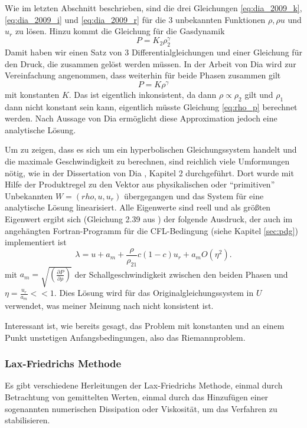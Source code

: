 Wie im letzten Abschnitt beschrieben, sind die drei Gleichungen
\ref{eq:dia_2009_k}, \ref{eq:dia_2009_i} und \ref{eq:dia_2009_r} für
die 3 unbekannten Funktionen $\rho, \rho u$ und $u_r$ zu lösen. Hinzu
kommt die Gleichung für die Gasdynamik
\[
P = K_2 \rho_2^\gamma
\]
Damit haben wir einen Satz von 3 Differentialgleichungen und einer
Gleichung für den Druck, die zusammen gelöst werden müssen. In der
Arbeit von Dia wird zur Vereinfachung angenommen, dass weiterhin für
beide Phasen zusammen gilt
\[
P = K \rho^\gamma
\]
mit konstanten $K$. Das ist eigentlich inkonsistent, da dann $\rho
\propto \rho_2$ gilt und $\rho_1$ dann nicht konstant sein kann,
eigentlich müsste Gleichung \ref{eq:rho_p} berechnet werden.  Nach
Aussage von Dia ermöglicht diese Approximation jedoch eine analytische
Lösung.

Um zu zeigen, dass es sich um ein hyperbolischen Gleichungssystem
handelt und die maximale Geschwindigkeit zu berechnen, sind reichlich
viele Umformungen nötig, wie in der Dissertation von Dia
\cite{dia_diss}, Kapitel 2 durchgeführt.  Dort wurde mit Hilfe der
Produktregel zu den Vektor aus physikalischen oder ``primitiven''
Unbekannten $W = (rho, u, u_r)$ übergegangen und das System für eine
analytische Lösung linearisiert. Alle Eigenwerte sind reell und als
größten Eigenwert ergibt sich (Gleichung 2.39 aus \cite{dia_diss}) der
folgende Ausdruck, der auch im angehängten Fortran-Programm für die
CFL-Bedingung (siehe Kapitel \ref{sec:pdg}) implementiert ist
\begin{equation}
\lambda = u + a_m + \frac{\rho}{\rho_{21}} c (1-c) u_r + a_m
O(\eta^2).
\end{equation}
mit $a_m = \sqrt{\left(\frac{\partial P}{\partial \rho} \right)}$ der
Schallgeschwindigkeit zwischen den beiden Phasen und $\eta =
\frac{u_r}{a_m} << 1$. Dies Lösung wird für das
Originalgleichungssystem in $U$ verwendet, was meiner Meinung nach
nicht konsistent ist.

Interessant ist, wie bereits gesagt, das Problem mit konstanten und an
einem Punkt unstetigen Anfangsbedingungen, also das Riemannproblem.

\subsubsection{Lax-Friedrichs Methode}

Es gibt verschiedene Herleitungen der Lax-Friedrichs Methode, einmal
durch Betrachtung von gemittelten Werten, einmal durch das Hinzufügen
einer sogenannten numerischen Dissipation oder Viskosität, um das
Verfahren zu stabilisieren.

